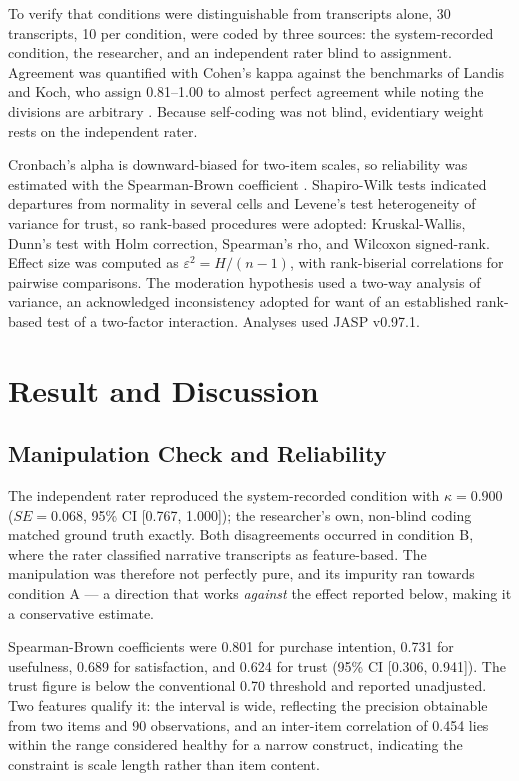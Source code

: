 \documentclass[conference]{IEEEtran}
\begin{document}
To verify that conditions were distinguishable from transcripts alone, 30 transcripts, 10
per condition, were coded by three sources: the system-recorded condition, the researcher,
and an independent rater blind to assignment. Agreement was quantified with Cohen's kappa
against the benchmarks of Landis and Koch, who assign 0.81--1.00 to almost perfect agreement
while noting the divisions are arbitrary \cite{landis1977}. Because self-coding was not
blind, evidentiary weight rests on the independent rater.

Cronbach's alpha is downward-biased for two-item scales, so reliability was estimated with
the Spearman-Brown coefficient \cite{eisinga2013}. Shapiro-Wilk tests indicated departures
from normality in several cells and Levene's test heterogeneity of variance for trust, so
rank-based procedures were adopted: Kruskal-Wallis, Dunn's test with Holm correction,
Spearman's rho, and Wilcoxon signed-rank. Effect size was computed as
$\varepsilon^{2} = H/(n-1)$, with rank-biserial correlations for pairwise comparisons. The
moderation hypothesis used a two-way analysis of variance, an acknowledged inconsistency
adopted for want of an established rank-based test of a two-factor interaction. Analyses
used JASP v0.97.1.

\section{Result and Discussion}
\label{sec:results}

\subsection{Manipulation Check and Reliability}

The independent rater reproduced the system-recorded condition with $\kappa = 0.900$
($SE = 0.068$, 95\% CI [0.767, 1.000]); the researcher's own, non-blind coding matched
ground truth exactly. Both disagreements occurred in condition B, where the rater classified
narrative transcripts as feature-based. The manipulation was therefore not perfectly pure,
and its impurity ran towards condition A --- a direction that works \textit{against} the
effect reported below, making it a conservative estimate.

Spearman-Brown coefficients were 0.801 for purchase intention, 0.731 for usefulness, 0.689
for satisfaction, and 0.624 for trust (95\% CI [0.306, 0.941]). The trust figure is below
the conventional 0.70 threshold and reported unadjusted. Two features qualify it: the
interval is wide, reflecting the precision obtainable from two items and 90 observations,
and an inter-item correlation of 0.454 lies within the range considered healthy for a narrow
construct, indicating the constraint is scale length rather than item content.
\end{document}
